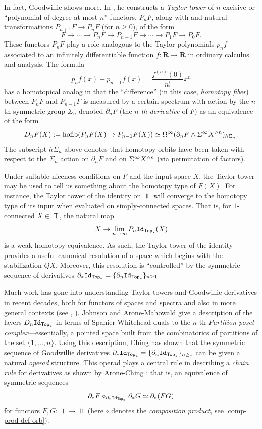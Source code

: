 In fact, Goodwillie shows more. In \cite{Goo-Calc3}, he constructs a \textit{Taylor tower} of $n$-excisive or ``polynomial of degree at most $n$'' functors, $P_n F$, along with and natural transformations $P_{n+1} F\to P_{n} F$ (for $n\geq 0$), of the form
\[
   F\to \cdots \to P_n F\to P_{n-1} F\to \cdots \to P_1 F\to P_0 F. %
\]
These functors $P_n F$ play a role analogous to the Taylor polynomials $p_nf$ associated to an infinitely differentiable function $f\colon \mathbf{R}\to\mathbf{R}$ in ordinary calculus and analysis. The formula \[ p_n f(x)-p_{n-1} f(x)=\dfrac{f^{(n)}(0)}{n!} x^n\] has a homotopical analog in that the ``difference'' (in this case, \textit{homotopy fiber}) between $P_n F$ and $P_{n-1}F$ is measured by a certain spectrum with action by the $n$-th symmetric group $\Sigma_n$ denoted $\partial_n F$ (the \textit{$n$-th derivative} of $F$) as an equivalence of the form \begin{equation*} \label{eq:homog-layer} D_nF(X) :=\operatorname{hofib} (P_n F(X) \to P_{n-1} F(X)) \simeq \Omega^{\infty} (\partial_n F \wedge \Sigma^{\infty} X^{\wedge n})_{h \Sigma_n}. \end{equation*} The subscript $h\Sigma_n$ above denotes that homotopy orbits have been taken with respect to the $\Sigma_n$ action on $\partial_n F$ and on $\Sigma^{\infty} X^{\wedge n}$ (via permutation of factors). 

Under suitable niceness conditions on $F$ and the input space $X$, the Taylor tower may be used to tell us something about the homotopy type of $F(X)$. For instance, the Taylor tower of the identity on $\Top$ will converge to the homotopy type of its input when evaluated on simply-connected spaces. That is, for $1$-connected $X\in \Top$, the natural map \[ X\to \lim_{n\to \infty} P_n \mathtt{Id}_{\mathsf{Top}_*} (X)\] is a weak homotopy equivalence. As such, the Taylor tower of the identity provides a useful canonical resolution of a space which begins with the stabilization $QX$. Moreover, this resolution is ``controlled'' by the symmetric sequence of derivatives $\partial_* \mathtt{Id}_{\mathsf{Top}_*}=\{\partial_n \mathtt{Id}_{\mathsf{Top}_*} \}_{n\geq 1}$

Much work has gone into understanding Taylor towers and Goodwillie derivatives in recent decades, both for functors of spaces and spectra and also in more general contexts (see \cite{Per-thesis}, \cite[]{Lur}). Johnson \cite{Joh} and Arone-Mahowald \cite{Ar-Mah} give a description of the layers $D_n \mathtt{Id}_{\mathsf{Top}_*}$ in terms of Spanier-Whitehead duals to the $n$-th \textit{Partition poset complex}---essentially, a pointed space built from the combinatorics of partitions of the set $\{1,\dots,n\}.$ Using this description, Ching \cite{Ching-thesis} has shown that the symmetric sequence of Goodwillie derivatives $\partial_* \mathtt{Id}_{\mathsf{Top}_*}=\{\partial_n \mathtt{Id}_{\mathsf{Top}_*} \}_{n\geq 1}$ can be given a natural \textit{operad} structure. This operad plays a central rule in describing a \textit{chain rule} for derivatives as shown by Arone-Ching \cite{AC-1}: that is, an equivalence of symmetric sequences \[ \partial_*F \circ_{\partial_*\mathtt{Id}_{\mathsf{Top}_*}} \partial_*G\simeq \partial_*(FG)\] for functors $F,G\colon \Top\to \Top$ (here $\circ$ denotes the \textit{composition product}, see \ref{comp-prod-def-orb}). 

